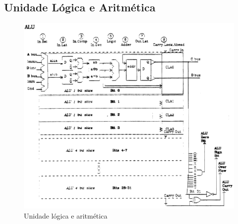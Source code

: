 \documentclass[
	article,			%
	11pt,				%
	oneside,			%
	a4paper,			%
	english,			%
	brazil,				%
	sumario=tradicional
	]{abntex2}
\begin{document}
\subsection{Unidade Lógica e Aritmética}
\begin{figure}[H]
    \centering
    \includegraphics[width=0.75\linewidth]{Original/ALU.png}
    \caption{Unidade lógica e aritmética\cite{peek_vlsi_1983}}
    \label{fig:aluPeek}    
\end{figure}
\end{document}
